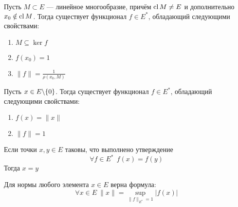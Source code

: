 \begin{corollary}
	Пусть $M \subset E$ --- линейное многообразие, причём $\operatorname{cl} M \neq E$ и дополнительно $x_0 \notin \operatorname{cl} M$. Тогда существует функционал $f \in E^*$, обладающий следующими свойствами:
	\begin{enumerate}
		\item $M \subseteq \ker f$
		
		\item $f(x_0) = 1$
		
		\item $\|f\| = \frac{1}{\rho(x_0, M)}$
	\end{enumerate}
\end{corollary}

\begin{corollary}
	Пусть $x \in E \backslash \{0\}$. Тогда существует функционал $f \in E^*$, обладающий следующими свойствами:
	\begin{enumerate}
		\item $f(x) = \|x\|$
		
		\item $\|f\| = 1$
	\end{enumerate}
\end{corollary}

\begin{corollary}
	Если точки $x, y \in E$ таковы, что выполнено утверждение
	\[
		\forall f \in E^*\ \ f(x) = f(y)
	\]
	Тогда $x = y$
\end{corollary}

\begin{corollary}
	Для нормы любого элемента $x \in E$ верна формула:
	\[
		\forall x \in E\ \|x\| = \sup_{\|f\|_{E^*} =  1} |f(x)|
	\]
\end{corollary}

